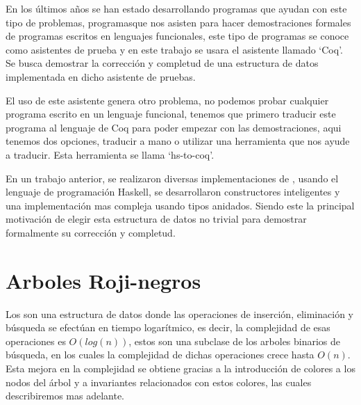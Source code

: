 En los últimos años se han estado desarrollando programas que ayudan con este tipo de problemas,
programasque nos asisten para hacer demostraciones formales de programas escritos en lenguajes
funcionales, este tipo de programas se conoce como asistentes de prueba y en este trabajo se usara
el asistente llamado `Coq'. Se busca demostrar la corrección y completud de una estructura de
datos implementada en dicho asistente de pruebas.

El uso de este asistente genera otro problema, no podemos probar cualquier programa escrito en un
lenguaje funcional, tenemos que primero traducir este programa al lenguaje de Coq para poder
empezar con las demostraciones, aqui tenemos dos opciones, traducir a mano o utilizar una
herramienta que nos ayude a traducir. Esta herramienta se llama `hs-to-coq'\cite{thrc}.

En un trabajo anterior\cite{tesisG}, se realizaron diversas implementaciones de {\arns}, usando el
lenguaje de programaci\'on Haskell, se desarrollaron constructores inteligentes y una
implementaci\'on mas compleja usando tipos anidados. Siendo este la principal motivaci\'on de
elegir esta estructura de datos no trivial para demostrar formalmente su corrección y completud.

\section{Arboles Roji-negros}
Los {\arns} son una estructura de datos donde las operaciones de inserci\'on, eliminaci\'on y
búsqueda se efectúan en tiempo logarítmico, es decir, la complejidad de esas operaciones es
$O(log(n))$, estos son una subclase de los arboles binarios de búsqueda, en los cuales la
complejidad de dichas operaciones crece hasta $O(n)$. Esta mejora en la complejidad se obtiene
gracias a la introducción de colores a los nodos del \'arbol y a invariantes relacionados con
estos colores, las cuales describiremos mas adelante.

